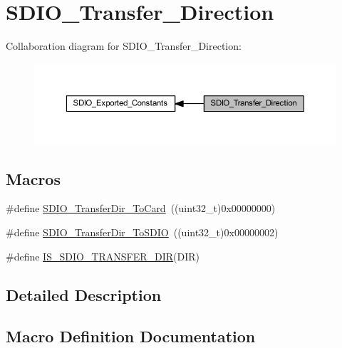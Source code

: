 \hypertarget{group___s_d_i_o___transfer___direction}{}\section{S\+D\+I\+O\+\_\+\+Transfer\+\_\+\+Direction}
\label{group___s_d_i_o___transfer___direction}
Collaboration diagram for S\+D\+I\+O\+\_\+\+Transfer\+\_\+\+Direction\+:
\nopagebreak
\begin{figure}[H]
\begin{center}
\leavevmode
\includegraphics[width=350pt]{group___s_d_i_o___transfer___direction}
\end{center}
\end{figure}
\subsection*{Macros}
\begin{DoxyCompactItemize}
\item 
\#define \hyperlink{group___s_d_i_o___transfer___direction_gaef8af0ffa4ea04b3362338d268cc0935}{S\+D\+I\+O\+\_\+\+Transfer\+Dir\+\_\+\+To\+Card}~((uint32\+\_\+t)0x00000000)
\item 
\#define \hyperlink{group___s_d_i_o___transfer___direction_ga55a6d9613d3e2e7762296b45d0d13222}{S\+D\+I\+O\+\_\+\+Transfer\+Dir\+\_\+\+To\+S\+D\+IO}~((uint32\+\_\+t)0x00000002)
\item 
\#define \hyperlink{group___s_d_i_o___transfer___direction_gaf84b8004cfef6a5a525b20db8a83c2f7}{I\+S\+\_\+\+S\+D\+I\+O\+\_\+\+T\+R\+A\+N\+S\+F\+E\+R\+\_\+\+D\+IR}(D\+IR)
\end{DoxyCompactItemize}


\subsection{Detailed Description}


\subsection{Macro Definition Documentation}
\mbox{\label{group___s_d_i_o___transfer___direction_gaf84b8004cfef6a5a525b20db8a83c2f7}} 
